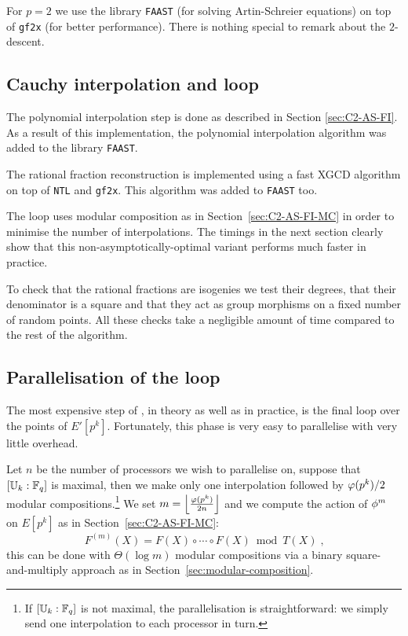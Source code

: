 For $p=2$ we use the library \texttt{FAAST} (for solving
Artin-Schreier equations) on top of \texttt{gf2x} (for better
performance). There is nothing special to remark about the
$2$-descent.


\subsection{Cauchy interpolation and loop}
\label{sec:impl:cauchy}
The polynomial interpolation step is done as described in Section
\ref{sec:C2-AS-FI}. As a result of this implementation, the polynomial
interpolation algorithm was added to the library \texttt{FAAST}.

The rational fraction reconstruction is implemented using a fast XGCD
algorithm on top of \texttt{NTL} and \texttt{gf2x}. This algorithm was
added to \texttt{FAAST} too.

The loop uses modular composition as in Section~\ref{sec:C2-AS-FI-MC}
in order to minimise the number of interpolations. The timings in the
next section clearly show that this non-asymptotically-optimal variant
performs much faster in practice.

To check that the rational fractions are isogenies we test their
degrees, that their denominator is a square and that they act as group
morphisms on a fixed number of random points. All these checks take a
negligible amount of time compared to the rest of the algorithm.


\subsection{Parallelisation of the loop}
\label{parallel}

The most expensive step of \ctwoasfimc{}, in theory as well as in
practice, is the final loop over the points of $E'[p^k]$. Fortunately,
this phase is very easy to parallelise with very little overhead.

Let $n$ be the number of processors we wish to parallelise on, suppose
that $[\mathbb{U}_k:\mathbb{F}_q]$ is maximal, then we make only one interpolation
followed by $\varphi(p^k)/2$ modular compositions.\footnote{If
  $[\mathbb{U}_k:\mathbb{F}_q]$ is not maximal, the parallelisation is
  straightforward: we simply send one interpolation to each processor
  in turn.} We set $m=\left\lfloor\frac{\varphi(p^k)}{2n}\right\rfloor$
and we compute the action of $\phi^{m}$ on $E[p^k]$ as in
Section~\ref{sec:C2-AS-FI-MC}:
\begin{equation*}
  F^{(m)}(X) = F(X) \circ \cdots \circ F(X) \bmod T(X)
  \;\text{,}
\end{equation*}
this can be done with $\Theta(\log m)$ modular compositions via a
binary square-and-multiply approach as in
Section~\ref{sec:modular-composition}.

